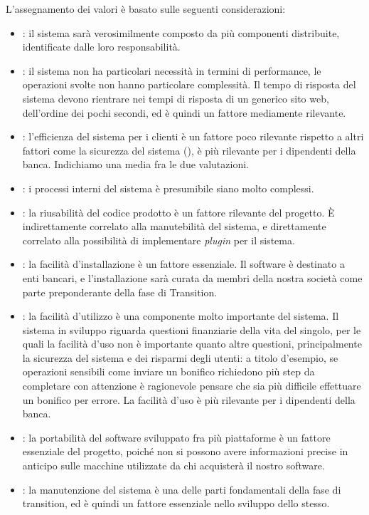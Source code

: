 L'assegnamento dei valori \`e basato sulle seguenti considerazioni:
\begin{itemize}
	\item {}: il sistema sar\`a verosimilmente composto da pi\`u componenti distribuite, identificate dalle loro responsabilit\`a.
	\item {}: il sistema non ha particolari necessit\`a in termini di performance, le operazioni svolte non hanno particolare complessit\`a.
		Il tempo di risposta del sistema devono rientrare nei tempi di risposta di un generico sito web, dell'ordine dei pochi secondi, ed \`e quindi un fattore mediamente rilevante.
	\item {}: l'efficienza del sistema per i clienti \`e un fattore poco rilevante rispetto a altri fattori come la sicurezza del sistema (), è più rilevante per i dipendenti della banca. Indichiamo una media fra le due valutazioni.
	\item {}: i processi interni del sistema \`e presumibile siano molto complessi.
	\item {}: la riusabilit\`a del codice prodotto \`e un fattore rilevante del progetto.
		\`E indirettamente correlato alla manutebilit\`a del sistema, e direttamente correlato alla possibilit\`a di implementare \emph{plugin} per il sistema.
	\item {}: la facilit\`a d'installazione \`e un fattore essenziale.
		Il software \`e destinato a enti bancari, e l'installazione sar\`a curata da membri della nostra societ\`a come parte preponderante della fase di Transition.
	\item {}: la facilit\`a d'utilizzo \`e una componente molto importante del sistema.
		Il sistema in sviluppo riguarda questioni finanziarie della vita del singolo, per le quali la facilit\`a d'uso non \`e importante quanto altre questioni, principalmente la sicurezza del sistema e dei risparmi degli utenti: a titolo d'esempio, se operazioni sensibili come inviare un bonifico richiedono pi\`u step da completare con attenzione \`e ragionevole pensare che sia pi\`u difficile effettuare un bonifico per errore.
		La facilit\`a d'uso \`e pi\`u rilevante per i dipendenti della banca.
	\item {}: la portabilit\`a del software sviluppato fra pi\`u piattaforme \`e un fattore essenziale del progetto, poich\'e non si possono avere informazioni precise in anticipo sulle macchine utilizzate da chi acquister\`a il nostro software.
	\item {}: la manutenzione del sistema \`e una delle parti fondamentali della fase di transition, ed \`e quindi un fattore essenziale nello sviluppo dello stesso.

\end{itemize}
